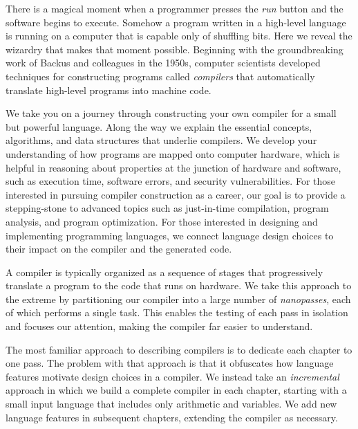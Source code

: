 \documentclass[7x10]{TimesAPriori_MIT}%
\numberwithin{theorem}{chapter}
\numberwithin{definition}{chapter}
\numberwithin{equation}{chapter}
\begin{document}
There is a magical moment when a programmer presses the \emph{run}
button and the software begins to execute. Somehow a program written
in a high-level language is running on a computer that is capable only
of shuffling bits. Here we reveal the wizardry that makes that moment
possible. Beginning with the groundbreaking work of Backus and
colleagues in the 1950s, computer scientists developed techniques for
constructing programs called \emph{compilers} that automatically
translate high-level programs into machine code.

We take you on a journey through constructing your own compiler for a
small but powerful language. Along the way we explain the essential
concepts, algorithms, and data structures that underlie compilers. We
develop your understanding of how programs are mapped onto computer
hardware, which is helpful in reasoning about properties at the
junction of hardware and software, such as execution time, software
errors, and security vulnerabilities.  For those interested in
pursuing compiler construction as a career, our goal is to provide a
stepping-stone to advanced topics such as just-in-time compilation,
program analysis, and program optimization.  For those interested in
designing and implementing programming languages, we connect language
design choices to their impact on the compiler and the generated code.

A compiler is typically organized as a sequence of stages that
progressively translate a program to the code that runs on
hardware. We take this approach to the extreme by partitioning our
compiler into a large number of \emph{nanopasses}, each of which
performs a single task. This enables the testing of each pass in
isolation and focuses our attention, making the compiler far easier to
understand.

The most familiar approach to describing compilers is to dedicate each
chapter to one pass. The problem with that approach is that it
obfuscates how language features motivate design choices in a
compiler. We instead take an \emph{incremental} approach in which we
build a complete compiler in each chapter, starting with a small input
language that includes only arithmetic and variables. We add new
language features in subsequent chapters, extending the compiler as
necessary.
\end{document}
